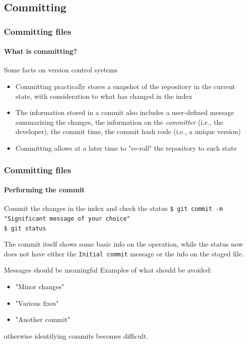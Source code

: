 \subsection{Committing}

\begin{frame}
\frametitle{Committing files}
\framesubtitle{What is committing?}

\begin{block}{Some facts on version control systems}
\begin{itemize}
\item Committing practically stores a snapshot of the repository in the current state, with consideration to what has changed in the index
\item The information stored in a commit also includes a user-defined message summarizing the changes, the information on the {\em committer} (i.e., the developer), the commit time, the commit hash code (i.e., a unique version)
\item Committing allows at a later time to "re-roll" the repository to such state
\end{itemize}
\end{block}

\end{frame}

\begin{frame}
\frametitle{Committing files}
\framesubtitle{Performing the commit}

\begin{block}{Commit the changes in the index and check the status}
\texttt{\$ git commit -m "Significant message of your choice"} \\
\texttt{\$ git status}

\medskip
The commit itself shows some basic info on the operation, while the status now does not have either the \texttt{Initial commit} message or the info on the staged file.
\end{block}

\pause
\begin{block}{Messages should be meaningful}
Examples of what should be avoided:
\begin{itemize}
\item "Minor changes"
\item "Various fixes"
\item "Another commit"
\end{itemize}
otherwise identifying commits becomes difficult.
\end{block}

\end{frame}

